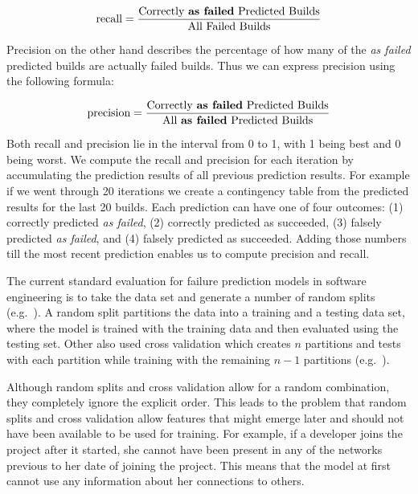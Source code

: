 \begin{equation}
\label{eq:recall}
\text{recall}=\frac{\text{Correctly \emph{as failed} Predicted Builds}}{\text{All Failed Builds}}
\end{equation}

Precision on the other hand describes the percentage of how many of the \emph{as failed} predicted builds are actually failed builds. Thus we can express precision using the following formula:

\begin{equation}
\label{eq:precision}
\text{precision}=\frac{\text{Correctly \emph{as failed} Predicted Builds}}{\text{All \emph{as failed} Predicted Builds}}
\end{equation}

Both recall and precision lie in the interval from 0 to 1, with 1 being best and 0 being worst.
We compute the recall and precision for each iteration by accumulating the prediction results of all previous prediction results.
For example if we went through 20 iterations we create a contingency table from the predicted results for the last 20 builds.
Each prediction can have one of four outcomes: (1) correctly predicted \emph{as failed}, (2) correctly predicted as succeeded, (3) falsely predicted \emph{as failed}, and (4) falsely predicted as succeeded.
Adding those numbers till the most recent prediction enables us to compute precision and recall.


The current standard evaluation for failure prediction models in software engineering is to take the data set and generate a number of random splits (e.g.~\cite{zimmermann:icse:2008,schroeter:isese:2006,nagappan:icse:2008}).
A random split partitions the data into a training and a testing data set, where the model is trained with the training data and then evaluated using the testing set.
Other also used cross validation which creates $n$ partitions and tests with each partition while training with the remaining $n-1$ partitions (e.g.~\cite{wolf:icse:2009}).

Although random splits and cross validation allow for a random combination, they completely ignore the explicit order.
This leads to the problem that random splits and cross validation allow features that might emerge later and should not have been available to be used for training.
For example, if a developer joins the project after it started, she cannot have been present in any of the networks previous to her date of joining the project.
This means that the model at first cannot use any information about her connections to others.

